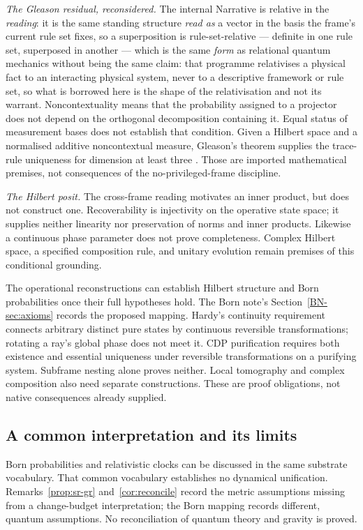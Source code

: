 \documentclass[11pt,a4paper]{article}
\theoremstyle{remark}\newtheorem{remark}[definition]{Remark}
\begin{document}
\emph{The Gleason residual, reconsidered.} The internal Narrative is relative in the
\emph{reading}: it is the same standing structure \emph{read as} a vector in the basis the
frame's current rule set fixes, so a superposition is rule-set-relative --- definite in one rule set, superposed in
another --- which is the same \emph{form} as relational quantum mechanics \citep{rovelli1996} without being the
same claim: that programme relativises a physical fact to an interacting physical system, never to a
descriptive framework or rule set, so what is borrowed here is the shape of the relativisation and not
its warrant. Noncontextuality means that the probability assigned to a projector does
not depend on the orthogonal decomposition containing it. Equal status of
measurement bases does not establish that condition. Given a Hilbert space
and a normalised additive noncontextual measure, Gleason's theorem supplies
the trace-rule uniqueness for dimension at least three \citep{gleason1957}.
Those are imported mathematical premises, not consequences of the
no-privileged-frame discipline.

\emph{The Hilbert posit.} The cross-frame reading motivates an inner product,
but does not construct one. Recoverability is injectivity on the operative state
space; it supplies neither linearity nor preservation of norms and inner products.
Likewise a continuous phase parameter does not prove completeness. Complex Hilbert
space, a specified composition rule, and unitary evolution remain premises of this
conditional grounding.

The operational reconstructions \citep{hardy2001,chiribella2011,masanes2011}
can establish Hilbert structure and Born probabilities once their full hypotheses
hold. The Born note's Section~\ref{BN-sec:axioms} records the proposed mapping.
Hardy's continuity requirement connects arbitrary distinct pure states by continuous
reversible transformations; rotating a ray's global phase does not meet it.
CDP purification requires both existence and essential uniqueness under reversible
transformations on a purifying system. Subframe nesting alone proves neither.
Local tomography and complex composition also need separate constructions.
These are proof obligations, not native consequences already supplied.

\subsection{A common interpretation and its limits}\label{sec:born-sr-gr}
Born probabilities and relativistic clocks can be discussed in the same substrate
vocabulary. That common vocabulary establishes no dynamical unification.
Remarks~\ref{prop:sr-gr} and~\ref{cor:reconcile} record the metric assumptions
missing from a change-budget interpretation; the Born mapping records different,
quantum assumptions. No reconciliation of quantum theory and gravity is proved.
\end{document}
